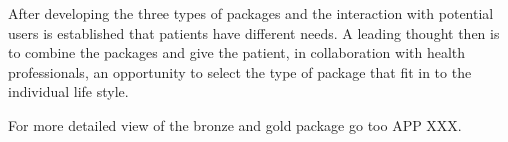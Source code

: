 After developing the three types of packages and the interaction with potential users is established that patients have different needs. A leading thought then is to combine the packages and give the patient, in collaboration with health professionals, an opportunity to select the type of package that fit in to the individual life style.  

For more detailed view of the bronze and gold package go too APP XXX. 













 
